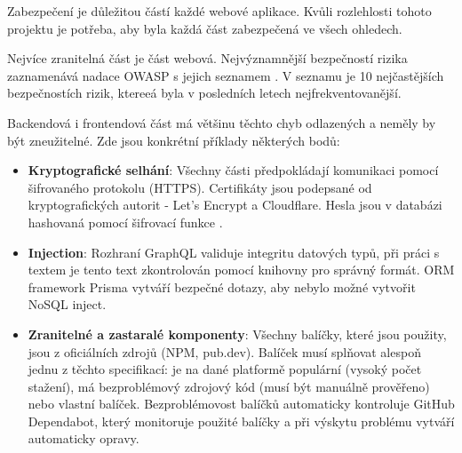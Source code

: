 Zabezpečení je důležitou částí každé webové aplikace. Kvůli rozlehlosti tohoto projektu je potřeba, aby byla každá část zabezpečená ve všech ohledech.\par
Nejvíce zranitelná část je část webová. Nejvýznamnější bezpečností rizika zaznamenává nadace OWASP\cite{OWASP} s jejich seznamem \cite{OWASP-top-ten}. V seznamu je 10 nejčastějších bezpečnostích rizik, ktereeá byla v posledních letech nejfrekventovanější.\par
Backendová i frontendová část má většinu těchto chyb odlazených a neměly by být zneužitelné. Zde jsou konkrétní příklady některých bodů:
\begin{itemize}
	\item \textbf{Kryptografické selhání}\cite{CryptographicFailures}: Všechny části předpokládají komunikaci pomocí šifrovaného protokolu (HTTPS). Certifikáty jsou podepsané od kryptografických autorit - Let's Encrypt a Cloudflare. Hesla jsou v databázi hashovaná pomocí šifrovací funkce \cite{bcrypt}.
	\item \textbf{Injection}\cite{Injection}: Rozhraní GraphQL validuje integritu datových typů, při práci s textem je tento text zkontrolován pomocí knihovny \cite{Validator} pro správný formát. ORM framework Prisma vytváří bezpečné dotazy, aby nebylo možné vytvořit NoSQL inject.
	\item \textbf{Zranitelné a zastaralé komponenty}\cite{VulnerableAndOutdatedComponents}: Všechny balíčky, které jsou použity, jsou z oficiálních zdrojů (NPM, pub.dev). Balíček musí splňovat alespoň jednu z těchto specifikací: je na dané platformě populární (vysoký počet stažení), má bezproblémový zdrojový kód (musí být manuálně prověřeno) nebo vlastní balíček. Bezproblémovost balíčků automaticky kontroluje GitHub Dependabot, který monitoruje použité balíčky a při výskytu problému vytváří automaticky opravy.
\end{itemize}
